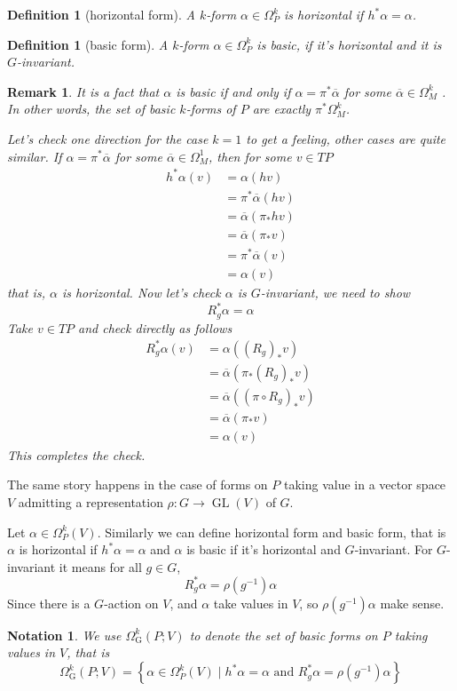 \documentclass[11pt]{amsart}
\numberwithin{equation}{section}
\theoremstyle{plain}
\theoremstyle{plain}
\newtheorem{defnsub}[thmsub]{Definition}
\newtheorem{remksub}[thmsub]{Remark}
\newtheorem{notasub}[thmsub]{Notation}
\numberwithin{equation}{section}
\begin{document}
\begin{defnsub}[horizontal form]
A $k$-form $\alpha\in\Omega^k_P$ is horizontal if $h^*\alpha=\alpha$.
\end{defnsub}
\begin{defnsub}[basic form]
A $k$-form $\alpha\in\Omega^k_P$ is basic, if it's horizontal and it is $G$-invariant.
\end{defnsub}
\begin{remksub}\normalfont
It is a fact that $\alpha$ is basic if and only if $\alpha=\pi^*\overline{\alpha}$ for some $\overline{\alpha}\in\Omega^k_M$ . In other words, the set of basic $k$-forms of $P$ are exactly $\pi^*\Omega_M^k$. 

Let's check one direction for the case $k=1$ to get a feeling, other cases are quite similar. If $\alpha=\pi^*\overline{\alpha}$ for some $\overline{\alpha}\in\Omega_M^1$, then for some $v\in TP$
$$
\begin{aligned}
h^*\alpha(v)&=\alpha(hv)\\
&=\pi^*\overline{\alpha}(hv)\\
&=\overline{\alpha}(\pi_*hv)\\
&=\overline{\alpha}(\pi_*v)\\
&=\pi^*\overline{\alpha}(v)\\
&=\alpha(v)
\end{aligned}
$$
that is, $\alpha$ is horizontal. Now let's check $\alpha$ is $G$-invariant, we need to show
$$
R_g^*\alpha=\alpha
$$
Take $v\in TP$ and check directly as follows
$$
\begin{aligned}
R_g^*\alpha(v)&=\alpha((R_g)_*v)\\
&=\overline{\alpha}(\pi_*(R_g)_*v)\\
&=\overline{\alpha}((\pi\circ R_g)_*v)\\
&=\overline{\alpha}(\pi_*v)\\
&=\alpha(v)
\end{aligned}
$$
This completes the check.
\end{remksub}

The same story happens in the case of forms on $P$ taking value in a vector space $V$ admitting a representation $\rho:G\to\operatorname{GL}(V)$ of $G$. 

Let $\alpha\in\Omega_P^k(V)$. Similarly we can define horizontal form and basic form, that is $\alpha$ is horizontal if $h^*\alpha=\alpha$ and $\alpha$ is basic if it's horizontal and $G$-invariant. For $G$-invariant it means for all $g\in G$,
$$
R_g^*\alpha=\rho(g^{-1})\alpha
$$
Since there is a $G$-action on $V$, and $\alpha$ take values in $V$, so $\rho(g^{-1})\alpha$ make sense.
\begin{notasub}\normalfont
We use $\Omega_{\mathrm{G}}^{k}(P;V)$ to denote the set of basic forms on $P$ taking values in $V$, that is
$$
\Omega_{\mathrm{G}}^{k}(P;V)=\left\{\alpha\in \Omega^{k}_P(V) \mid h^{*} \alpha=\alpha \text { and } R_g^* \alpha=\rho(g^{-1})\alpha\right\}
$$
\end{notasub}
\end{document}
